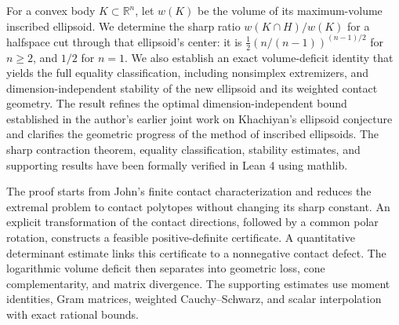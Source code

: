 For a convex body $K\subset\mathbb R^n$, let $w(K)$ be the volume of its maximum-volume inscribed ellipsoid. We determine the sharp ratio $w(K\cap H)/w(K)$ for a halfspace cut through that ellipsoid's center: it is $\frac12(n/(n-1))^{(n-1)/2}$ for $n\ge2$, and $1/2$ for $n=1$. We also establish an exact volume-deficit identity that yields the full equality classification, including nonsimplex extremizers, and dimension-independent stability of the new ellipsoid and its weighted contact geometry. The result refines the optimal dimension-independent bound established in the author's earlier joint work on Khachiyan's ellipsoid conjecture and clarifies the geometric progress of the method of inscribed ellipsoids. The sharp contraction theorem, equality classification, stability estimates, and supporting results have been formally verified in Lean 4 using mathlib.

The proof starts from John's finite contact characterization and reduces the extremal problem to contact polytopes without changing its sharp constant. An explicit transformation of the contact directions, followed by a common polar rotation, constructs a feasible positive-definite certificate. A quantitative determinant estimate links this certificate to a nonnegative contact defect. The logarithmic volume deficit then separates into geometric loss, cone complementarity, and matrix divergence. The supporting estimates use moment identities, Gram matrices, weighted Cauchy--Schwarz, and scalar interpolation with exact rational bounds.

